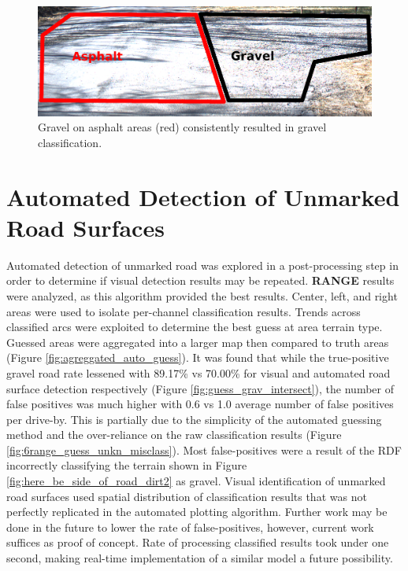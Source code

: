 \documentclass[numbered,pdftex]{ohio-etd}
\begin{document}
{{{		\begin{figure}[H]
			\centering
			\includegraphics[width=0.95\linewidth]{Defense_Images/gravel_on_asphalt}
			\caption[Gravel on Asphalt]{Gravel on asphalt areas (red) consistently resulted in gravel classification.}
			\label{fig:gravel_on_asphalt}
		\end{figure}
		
	
	}
	
	\section{Automated Detection of Unmarked Road Surfaces}\label{sec:auto_det}{
		
		
		{Automated detection of unmarked road was explored in a post-processing step in order to determine if visual detection results may be repeated. \textbf{RANGE} results were analyzed, as this algorithm provided the best results. Center, left, and right areas were used to isolate per-channel classification results. Trends across classified arcs were exploited to determine the best guess at area terrain type. Guessed areas were aggregated into a larger map then compared to truth areas (Figure \ref{fig:agreggated_auto_guess}). It was found that while the true-positive gravel road rate lessened with 89.17\% vs 70.00\% for visual and automated road surface detection respectively (Figure \ref{fig:guess_grav_intersect}), the number of false positives was much higher with 0.6 vs 1.0 average number of false positives per drive-by. This is partially due to the simplicity of the automated guessing method and the over-reliance on the raw classification results (Figure \ref{fig:6range_guess_unkn_misclass}). Most false-positives were a result of the RDF incorrectly classifying the terrain shown in Figure \ref{fig:here_be_side_of_road_dirt2} as gravel. Visual identification of unmarked road surfaces used spatial distribution of classification results that was not perfectly replicated in the automated plotting algorithm. Further work may be done in the future to lower the rate of false-positives, however, current work suffices as proof of concept. Rate of processing classified results took under one second, making real-time implementation of a similar model a future possibility. }
		
}}}
\end{document}
